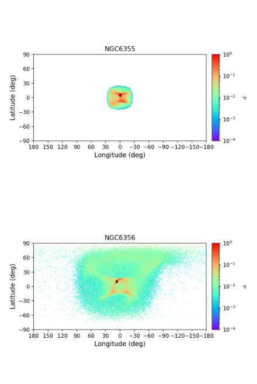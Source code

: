 \begin{figure}
\begin{center}
                \includegraphics[clip=true, trim = 0mm 20mm 0mm 10mm, width=1\columnwidth]{images/error_plots_NGC6355.png}
                \includegraphics[clip=true, trim = 0mm 20mm 0mm 10mm, width=1\columnwidth]{images/error_plots_NGC6356.png}
                

\end{center}
\end{figure}
